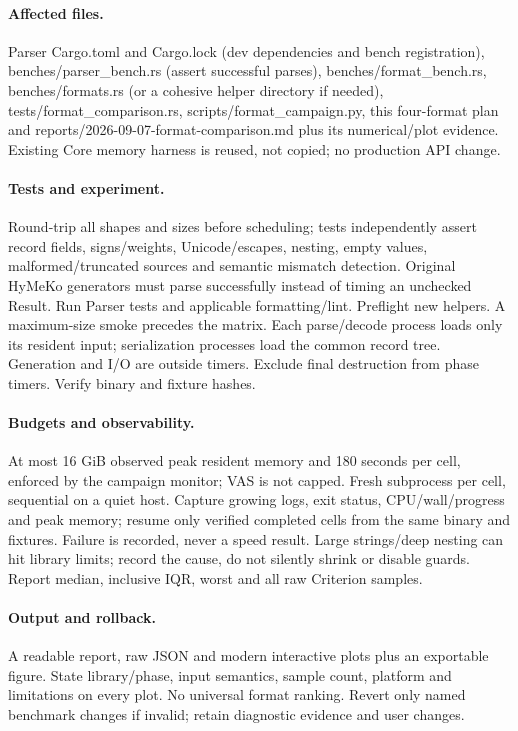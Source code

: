 \documentclass[11pt,a4paper]{article}
\begin{document}
\paragraph{Affected files.} Parser Cargo.toml and Cargo.lock (dev dependencies and
bench registration), benches/parser\_bench.rs (assert successful parses),
benches/format\_bench.rs, benches/formats.rs (or a cohesive helper directory if
needed), tests/format\_comparison.rs, scripts/format\_campaign.py, this four-format
plan and reports/2026-09-07-format-comparison.md plus its numerical/plot evidence.
Existing Core memory harness is reused, not copied; no production API change.
\paragraph{Tests and experiment.} Round-trip all shapes and sizes before scheduling;
tests independently assert record fields, signs/weights, Unicode/escapes, nesting,
empty values, malformed/truncated sources and semantic mismatch detection. Original
HyMeKo generators must parse successfully instead of timing an unchecked Result.
Run Parser tests and applicable formatting/lint. Preflight new helpers. A maximum-size
smoke precedes the matrix. Each parse/decode process loads only its resident input;
serialization processes load the common record tree. Generation and I/O are outside
timers. Exclude final destruction from phase timers. Verify binary and fixture hashes.
\paragraph{Budgets and observability.} At most 16 GiB observed peak resident memory
and 180 seconds per cell, enforced by the campaign monitor; VAS is not capped.
Fresh subprocess per cell, sequential on a quiet host. Capture growing logs, exit
status, CPU/wall/progress and peak memory; resume only verified completed cells from
the same binary and fixtures. Failure is recorded, never a speed result. Large
strings/deep nesting can hit library limits; record the cause, do not silently shrink
or disable guards. Report median, inclusive IQR, worst and all raw Criterion samples.
\paragraph{Output and rollback.} A readable report, raw JSON and modern interactive
plots plus an exportable figure. State library/phase, input semantics, sample count,
platform and limitations on every plot. No universal format ranking. Revert only
named benchmark changes if invalid; retain diagnostic evidence and user changes.
\end{document}
